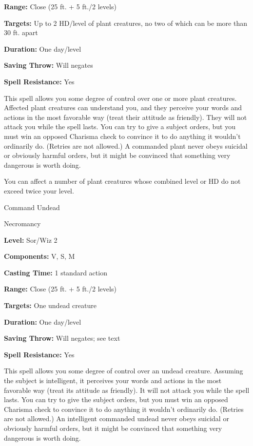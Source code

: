 \documentclass{article}
\begin{document}
\textbf{Range:} Close (25 ft. + 5 ft./2 levels)

\textbf{Targets:} Up to 2 HD/level of plant creatures, no two of which can be more 
than 30 ft. apart

\textbf{Duration:} One day/level

\textbf{Saving Throw: }Will negates

\textbf{Spell Resistance:} Yes

This spell allows you some degree of control over one or more plant creatures. 
Affected plant creatures can understand you, and they perceive your words and actions 
in the most favorable way (treat their attitude as friendly). They will not attack 
you while the spell lasts. You can try to give a subject orders, but you must win 
an opposed Charisma check to convince it to do anything it wouldn't ordinarily 
do. (Retries are not allowed.) A commanded plant never obeys suicidal or obviously 
harmful orders, but it might be convinced that something very dangerous is worth 
doing.

You can affect a number of plant creatures whose combined level or HD do not exceed 
twice your level.

\vspace{12pt}
Command Undead

Necromancy

\textbf{Level:} Sor/Wiz 2

\textbf{Components:} V, S, M

\textbf{Casting Time:} 1 standard action

\textbf{Range:} Close (25 ft. + 5 ft./2 levels)

\textbf{Targets:} One undead creature

\textbf{Duration:} One day/level

\textbf{Saving Throw: }Will negates; see text

\textbf{Spell Resistance:} Yes

This spell allows you some degree of control over an undead creature. Assuming 
the subject is intelligent, it perceives your words and actions in the most favorable 
way (treat its attitude as friendly). It will not attack you while the spell lasts. 
You can try to give the subject orders, but you must win an opposed Charisma check 
to convince it to do anything it wouldn't ordinarily do. (Retries are not allowed.) 
An intelligent commanded undead never obeys suicidal or obviously harmful orders, 
but it might be convinced that something very dangerous is worth doing.
\end{document}
